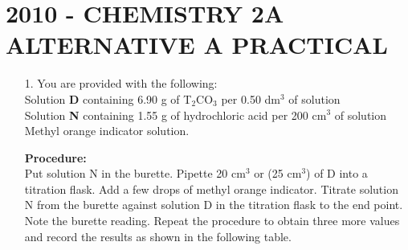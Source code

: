 \section{2010 - CHEMISTRY 2A ALTERNATIVE A PRACTICAL}

\begin{enumerate}

\item[1.] You are provided with the following:\\
Solution \textbf{D} containing 6.90 g of T$_2$CO$_3$ per 0.50 dm$^3$ of solution\\
Solution \textbf{N} containing 1.55 g of hydrochloric acid per 200 cm$^3$ of solution\\
Methyl orange indicator solution.\\
\vspace{-6pt}

\textbf{Procedure:}\\
Put solution N in the burette. Pipette 20 cm$^3$ or (25 cm$^3$) of D into a titration flask. Add a few drops of methyl orange indicator. Titrate solution N from the burette against solution D in the titration flask to the end point. Note the burette reading. Repeat the procedure to obtain three more values and record the results as shown in the following table.\\


\end{enumerate}
